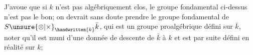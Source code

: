 J'avoue que si $k$ n'est pas algébriquement clos, le groupe fondamental ci-dessus n'est   pas le bon; on devrait sans doute prendre le groupe fondamental de $S\unsure{\otimes|\times}_{\handwritten{k}}\bar{k}$, qui est un groupe proalgébrique défini sur $\bar{k}$, noter qu'il est muni d'une donnée de descente de $\bar{k}$ à $k$ et est par suite défini en réalité sur $k$; 
